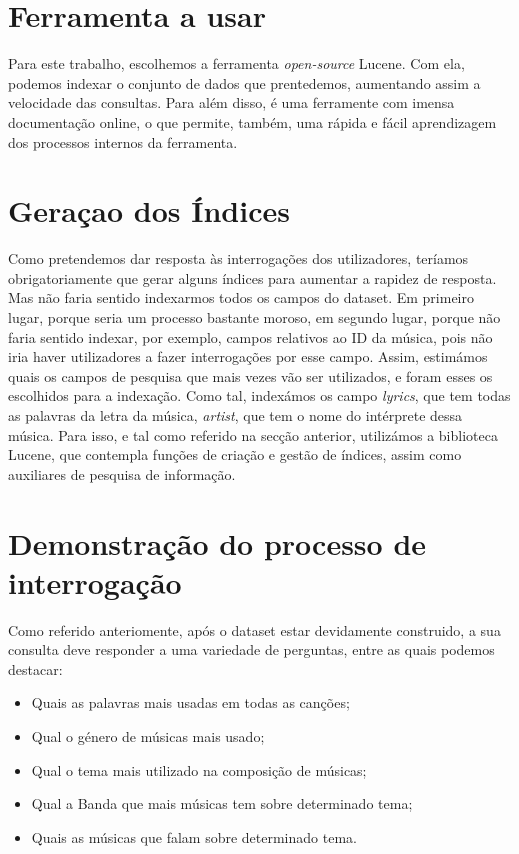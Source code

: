 \documentclass[twocolumn,twoside,10pt,a4paper]{article}
\begin{document}
\section{Ferramenta a usar}\label{sec:ferramenta}

Para este trabalho, escolhemos a ferramenta \textit{open-source} Lucene. Com ela, podemos indexar o conjunto de dados que prentedemos, aumentando assim a velocidade das consultas. Para além disso, é uma ferramente com imensa documentação online, o que permite, também, uma rápida e fácil aprendizagem dos processos internos da ferramenta.

\section{Geraçao dos Índices}\label{sec:indices}

Como pretendemos dar resposta às interrogações dos utilizadores, teríamos obrigatoriamente que gerar alguns índices para aumentar a rapidez de resposta. Mas não faria sentido indexarmos todos os campos do dataset. Em primeiro lugar, porque seria um processo bastante moroso, em segundo lugar, porque não faria sentido indexar, por exemplo, campos relativos ao ID da música, pois não iria haver utilizadores a fazer interrogações por esse campo. Assim, estimámos quais os campos de pesquisa que mais vezes vão ser utilizados, e foram esses os escolhidos para a indexação. Como tal, indexámos os campo \textit{lyrics}, que tem todas as palavras da letra da música, \textit{artist}, que tem o nome do intérprete dessa música. Para isso, e tal como referido na secção anterior, utilizámos a biblioteca Lucene, que contempla funções de criação e gestão de índices, assim como auxiliares de pesquisa de informação.


\section{Demonstração do processo de interrogação}\label{sec:demonstração}



Como referido anteriomente, após o dataset estar devidamente construido, a sua consulta deve responder a uma variedade de perguntas, entre as quais podemos destacar:

\begin{itemize}
	\item Quais as palavras mais usadas em todas as canções;
	\item Qual o género de músicas mais usado;
	\item Qual o tema mais utilizado na composição de músicas;
	\item Qual a Banda que mais músicas tem sobre determinado tema;
	\item Quais as músicas que falam sobre determinado tema.
\end{itemize}
\end{document}
